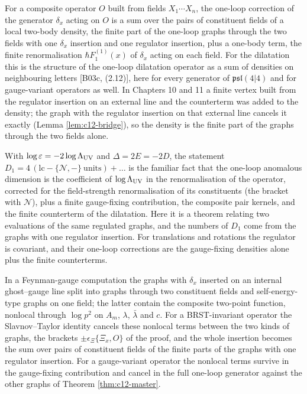 \begin{remark}
For a composite operator $O$ built from fields $X_1\cdots X_n$, the one-loop correction of the generator $\delta_x$ acting on $O$ is a sum over the pairs of constituent fields of a local two-body density, the finite part of the one-loop graphs through the two fields with one $\delta_x$ insertion and one regulator insertion, plus a one-body term, the finite renormalisation $\hbar F_1^{(1)}(x)$ of $\delta_x$ acting on each field. For the dilatation this is the structure of the one-loop dilatation operator as a sum of densities on neighbouring letters [B03c, (2.12)], here for every generator of $\mathfrak{psl}(4|4)$ and for gauge-variant operators as well. In Chapters 10 and 11 a finite vertex built from the regulator insertion on an external line and the counterterm was added to the density; the graph with the regulator insertion on that external line cancels it exactly (Lemma \ref{lem:c12-bridge}), so the density is the finite part of the graphs through the two fields alone.
\end{remark}

\begin{remark}
With $\log\varepsilon=-2\log\Lambda_{\rm UV}$ and $\Delta=2E=-2D$, the statement $D_1=4\,(\mathrm{lc}-\{\mathcal N,-\}\ \text{units})+\dots$ is the familiar fact that the one-loop anomalous dimension is the coefficient of $\log\Lambda_{\rm UV}$ in the renormalisation of the operator, corrected for the field-strength renormalisation of its constituents (the bracket with $\mathcal N$), plus a finite gauge-fixing contribution, the composite pair kernels, and the finite counterterm of the dilatation. Here it is a theorem relating two evaluations of the same regulated graphs, and the numbers of $D_1$ come from the graphs with one regulator insertion. For translations and rotations the regulator is covariant, and their one-loop corrections are the gauge-fixing densities alone plus the finite counterterms.
\end{remark}

\begin{remark}
In a Feynman-gauge computation the graphs with $\delta_x$ inserted on an internal ghost--gauge line split into graphs through two constituent fields and self-energy-type graphs on one field; the latter contain the composite two-point function, nonlocal through $\log p^2$ on $A_m$, $\lambda$, $\bar\lambda$ and $c$. For a BRST-invariant operator the Slavnov--Taylor identity cancels these nonlocal terms between the two kinds of graphs, the brackets $\pm\epsilon_\Xi\{\Xi_x,O\}$ of the proof, and the whole insertion becomes the sum over pairs of constituent fields of the finite parts of the graphs with one regulator insertion. For a gauge-variant operator the nonlocal terms survive in the gauge-fixing contribution and cancel in the full one-loop generator against the other graphs of Theorem \ref{thm:c12-master}.
\end{remark}

